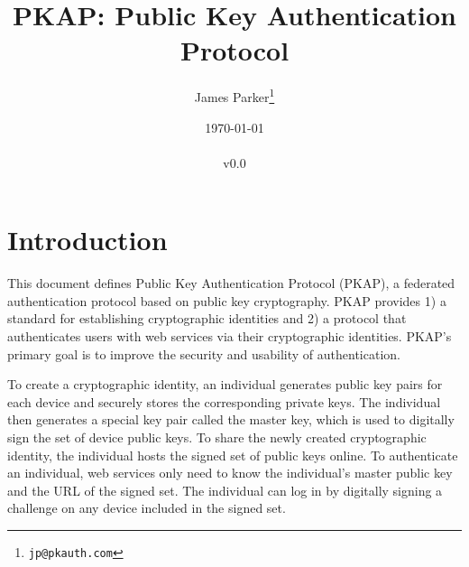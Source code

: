 \documentclass{article}
\newcommand{\pkap}{PKAP}
\newcommand{\pkaplong}{Public Key Authentication Protocol}
\begin{document}
\title{\pkap: \pkaplong}

\author{James Parker\thanks{\texttt{jp@pkauth.com}}}
\date{\today\\ \ \\ v0.0}


\maketitle

\section{Introduction}

%
%
%



This document defines \pkaplong{} (\pkap{}), a federated authentication protocol based on public key cryptography. 
\pkap{} provides 1) a standard for establishing cryptographic identities and 2) a protocol that authenticates users with web services via their cryptographic identities. 
\pkap{}'s primary goal is to improve the security and usability of authentication. 


%
%
%
%
%


To create a cryptographic identity, an individual generates public key pairs for each device and securely stores the corresponding private keys. 
The individual then generates a special key pair called the master key, which is used to digitally sign the set of device public keys. 
To share the newly created cryptographic identity, the individual hosts the signed set of public keys online. 
To authenticate an individual, web services only need to know the individual's master public key and the URL of the signed set. 
The individual can log in by digitally signing a challenge on any device included in the signed set. 
\end{document}
